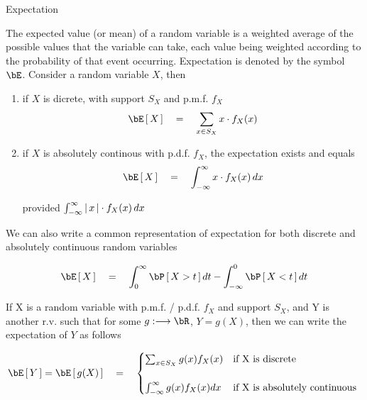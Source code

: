 \documentclass{article}
\begin{document}
\makeheader%

\begin{ssection}{Expectation}

	\begin{definition}[Expectation]
		The expected value (or mean) of a random variable is a weighted average of the possible values that the variable can take, each value being weighted according to the probability of that event occurring. Expectation is denoted by the symbol $\bE$. Consider a random variable $X$, then

		\begin{enumerate}[label=(\roman*)]
			\item if $X$ is dicrete, with support $S_X$ and p.m.f. $f_X$
				\begin{align*}
					\E{X}	\eq	\sum_{x \in S_X} x \cdot f_X(x)
				\end{align*}
			\item if $X$ is absolutely continous with p.d.f. $f_X$, the expectation exists and equals
				\begin{align*}
					\E{X}	\eq	\int_{- \infty}^\infty x \cdot f_X(x) \,dx
				\end{align*}

				provided $\int_{- \infty}^\infty \left| \,{x}\, \right| \cdot f_X(x) \,dx$ \br
		\end{enumerate}
	\end{definition}

	\begin{result}
		We can also write a common representation of expectation for both discrete and absolutely continuous random variables

		\begin{align*}
			\E{X}	\eq	\int_0^\infty \prob{X > t} dt - \int_{- \infty}^0 \prob{X < t} dt
		\end{align*} \br
	\end{result}

	\begin{result}
		If X is a random variable with p.m.f. / p.d.f. $f_X$ and support $S_X$, and Y is another r.v. such that for some $g : \br \lra \bR$, $Y = g(X)$, then we can write the expectation of $Y$ as follows

		\begin{align*}
			\E{Y} = \E{g(X)}	\eq	\begin{cases}
				\sum_{x \in S_X} g(x) f_X(x)			&\mt{if X is discrete} \\
				\\
				\int_{- \infty}^\infty g(x) f_X(x) dx	&\mt{if X is absolutely continuous}
			\end{cases}
		\end{align*} \br
	\end{result}


\end{ssection}
\end{document}
